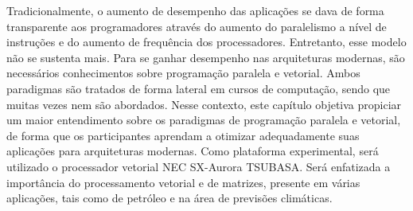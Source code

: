 \begin{resumo}
Tradicionalmente, o aumento de desempenho das aplicações se dava de forma transparente aos programadores através do aumento do paralelismo a nível de instruções e do aumento de frequência dos processadores. Entretanto, esse modelo não se sustenta mais. Para se ganhar desempenho nas arquiteturas modernas, são necessários conhecimentos sobre programação paralela e vetorial. Ambos paradigmas são tratados de forma lateral em cursos de computação, sendo que muitas vezes nem são abordados. Nesse contexto, este capítulo objetiva propiciar um maior entendimento sobre os paradigmas de programação paralela e vetorial, de forma que os participantes aprendam a otimizar adequadamente suas aplicações para arquiteturas modernas. Como plataforma experimental, será utilizado o processador vetorial NEC SX-Aurora TSUBASA. Será enfatizada a importância do processamento vetorial e de matrizes, presente em várias aplicações, tais como de petróleo e na área de previsões climáticas.
\end{resumo}